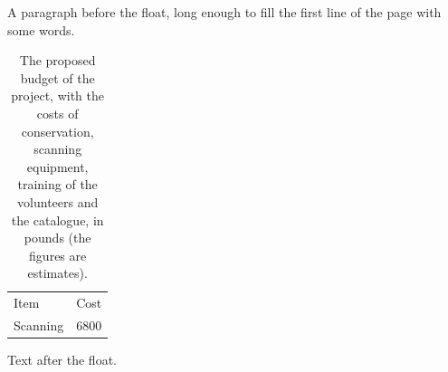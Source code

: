 \documentclass{scrartcl}
\begin{document}
A paragraph before the float, long enough to fill the first line of the page with some words.
\begin{table}
\centering
\begin{tabular}{lr}
Item & Cost \\
Scanning & 6800 \\
\end{tabular}
\caption{The proposed budget of the project, with the costs of conservation, scanning equipment, training of the volunteers and the catalogue, in pounds (the figures are estimates).}
\end{table}
Text after the float.
\end{document}
